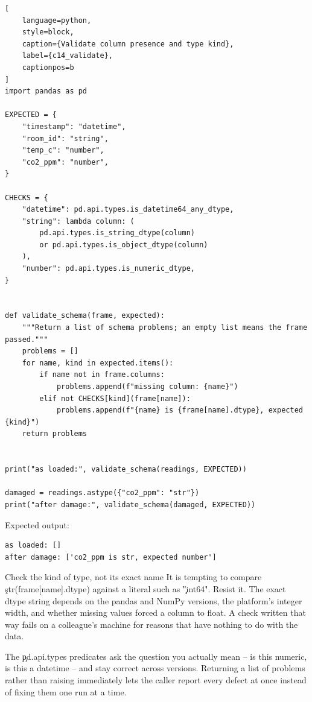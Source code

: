 \begin{lstlisting}[
    language=python,
    style=block,
    caption={Validate column presence and type kind},
    label={c14_validate},
    captionpos=b
]
import pandas as pd

EXPECTED = {
    "timestamp": "datetime",
    "room_id": "string",
    "temp_c": "number",
    "co2_ppm": "number",
}

CHECKS = {
    "datetime": pd.api.types.is_datetime64_any_dtype,
    "string": lambda column: (
        pd.api.types.is_string_dtype(column)
        or pd.api.types.is_object_dtype(column)
    ),
    "number": pd.api.types.is_numeric_dtype,
}


def validate_schema(frame, expected):
    """Return a list of schema problems; an empty list means the frame passed."""
    problems = []
    for name, kind in expected.items():
        if name not in frame.columns:
            problems.append(f"missing column: {name}")
        elif not CHECKS[kind](frame[name]):
            problems.append(f"{name} is {frame[name].dtype}, expected {kind}")
    return problems


print("as loaded:", validate_schema(readings, EXPECTED))

damaged = readings.astype({"co2_ppm": "str"})
print("after damage:", validate_schema(damaged, EXPECTED))
\end{lstlisting}

Expected output:

\begin{lstlisting}[language=text, style=block, caption={A schema check that catches a real defect}, label={c14_validate_output}, captionpos=b]
as loaded: []
after damage: ['co2_ppm is str, expected number']
\end{lstlisting}

\begin{SyntaxBox}{Check the kind of type, not its exact name}
It is tempting to compare \c{str(frame[name].dtype)} against a literal such as
\c{"int64"}. Resist it. The exact dtype string depends on the pandas and NumPy
versions, the platform's integer width, and whether missing values forced a
column to float. A check written that way fails on a colleague's machine for
reasons that have nothing to do with the data.

The \c{pd.api.types} predicates ask the question you actually mean -- is this
numeric, is this a datetime -- and stay correct across versions. Returning a
list of problems rather than raising immediately lets the caller report every
defect at once instead of fixing them one run at a time.
\end{SyntaxBox}

